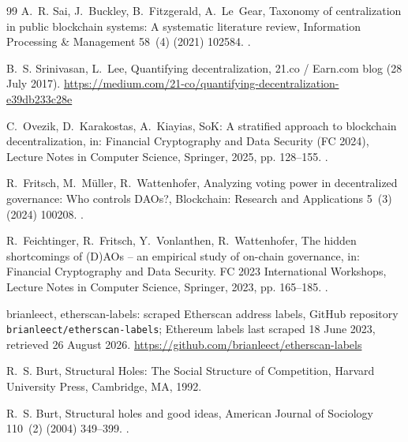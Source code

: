 \begin{thebibliography}{99}
A.~R. Sai, J.~Buckley, B.~Fitzgerald, A.~Le~Gear, Taxonomy of centralization
in public blockchain systems: A systematic literature review, Information
Processing \& Management 58~(4) (2021) 102584.
\newblock \href{https://doi.org/10.1016/j.ipm.2021.102584}{}.

B.~S. Srinivasan, L.~Lee, Quantifying decentralization, 21.co / Earn.com
blog (28 July 2017).
\newline\urlprefix\url{https://medium.com/21-co/quantifying-decentralization-e39db233c28e}

C.~Ovezik, D.~Karakostas, A.~Kiayias, {SoK}: A stratified approach to
blockchain decentralization, in: Financial Cryptography and Data Security (FC
2024), Lecture Notes in Computer Science, Springer, 2025, pp. 128--155.
\newblock \href{https://doi.org/10.1007/978-3-031-78676-1_8}{}.

R.~Fritsch, M.~M{\"u}ller, R.~Wattenhofer, Analyzing voting power in
decentralized governance: Who controls {DAOs}?, Blockchain: Research and
Applications 5~(3) (2024) 100208.
\newblock \href{https://doi.org/10.1016/j.bcra.2024.100208}{}.

R.~Feichtinger, R.~Fritsch, Y.~Vonlanthen, R.~Wattenhofer, The hidden
shortcomings of {(D)AOs} -- an empirical study of on-chain governance, in:
Financial Cryptography and Data Security. FC 2023 International Workshops,
Lecture Notes in Computer Science, Springer, 2023, pp. 165--185.
\newblock \href{https://doi.org/10.1007/978-3-031-48806-1_11}{}.

{brianleect}, etherscan-labels: scraped Etherscan address labels, GitHub repository
\texttt{brianleect/etherscan-labels}; Ethereum labels last scraped 18 June
2023, retrieved 26 August 2026.
\newline\urlprefix\url{https://github.com/brianleect/etherscan-labels}

R.~S. Burt, Structural Holes: The Social Structure of Competition, Harvard
University Press, Cambridge, MA, 1992.

R.~S. Burt, Structural holes and good ideas, American Journal of Sociology
110~(2) (2004) 349--399.
\newblock \href{https://doi.org/10.1086/421787}{}.


\end{thebibliography}
